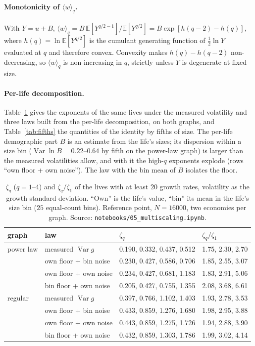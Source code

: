 \documentclass[pre,twocolumn,superscriptaddress,nofootinbib]{revtex4-2}
\newcommand{\E}{\mathbb E}
\newcommand{\Var}{\operatorname{Var}}
\begin{document}
\paragraph{Monotonicity of $\langle w\rangle_q$.}  With $Y=u+B$, $\langle w\rangle_q=B\,\E[Y^{q/2-1}]/\E[Y^{q/2}]=
B\exp[h(q-2)-h(q)]$, where $h(q)=\ln\E[Y^{q/2}]$ is the cumulant generating function of $\tfrac12\ln Y$
evaluated at $q$ and therefore convex.  Convexity makes $h(q)-h(q-2)$ non-decreasing, so $\langle w\rangle_q$ is
non-increasing in $q$, strictly unless $Y$ is degenerate at fixed size.

\paragraph{Per-life decomposition.}  Table~\ref{tab:mslaw} gives the exponents of the same lives under the
measured volatility and three laws built from the per-life decomposition, on both graphs, and
Table~\ref{tab:fifths} the quantities of the identity by fifths of size.  The per-life demographic part
$B$ is an estimate from the life's sizes; its dispersion within a size bin ($\Var\ln B=0.22$--$0.64$ by fifth on the
power-law graph) is larger than the measured volatilities allow, and with it the high-$q$ exponents
explode (rows ``own floor + own noise'').  The law with the bin mean of $B$ isolates the floor.

\begin{table}[t]
\caption{$\zeta_q$ ($q=1$--$4$) and $\zeta_q/\zeta_1$ of the lives with at least $20$ growth rates, volatility
as the growth standard deviation.  ``Own'' is the life's value, ``bin'' its mean in the life's size bin
($25$ equal-count bins).  Reference point, $N=16000$, two economies per graph.  Source:
\texttt{notebooks/05\_multiscaling.ipynb}.}
\label{tab:mslaw}
\begin{ruledtabular}
\begin{tabular}{llll}
graph & law & $\zeta_q$ & $\zeta_q/\zeta_1$\\
\hline
power law & measured $\Var g$ & 0.190, 0.332, 0.437, 0.512 & 1.75, 2.30, 2.70\\
 & own floor + bin noise & 0.230, 0.427, 0.586, 0.706 & 1.85, 2.55, 3.07\\
 & own floor + own noise & 0.234, 0.427, 0.681, 1.183 & 1.83, 2.91, 5.06\\
 & bin floor + own noise & 0.205, 0.427, 0.755, 1.355 & 2.08, 3.68, 6.61\\
regular & measured $\Var g$ & 0.397, 0.766, 1.102, 1.403 & 1.93, 2.78, 3.53\\
 & own floor + bin noise & 0.433, 0.859, 1.276, 1.680 & 1.98, 2.95, 3.88\\
 & own floor + own noise & 0.443, 0.859, 1.275, 1.726 & 1.94, 2.88, 3.90\\
 & bin floor + own noise & 0.432, 0.859, 1.303, 1.786 & 1.99, 3.02, 4.14\\
\end{tabular}
\end{ruledtabular}
\end{table}
\end{document}

